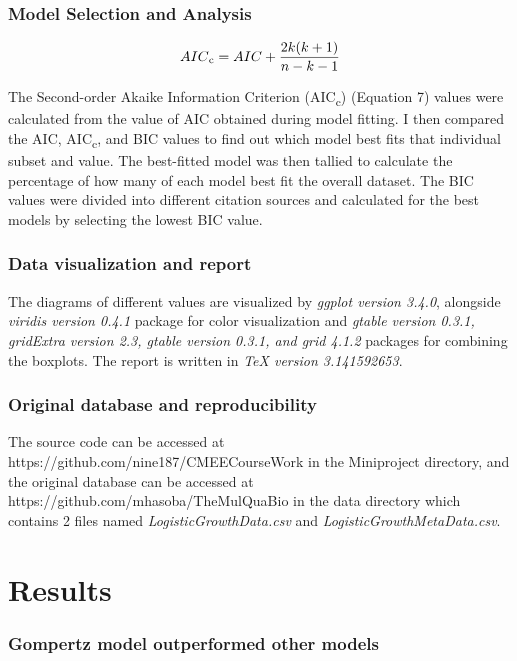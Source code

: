 \documentclass[11pt]{article}
\begin{document}
  \subsubsection*{Model Selection and Analysis}
  \begin{equation}
    AIC\textsubscript{c} = AIC + \frac{2k(k + 1)}{n - k - 1}
  \end{equation}

  \noindent The Second-order Akaike Information Criterion (AIC\textsubscript{c}) (Equation 7) values were calculated from the value of AIC obtained during model fitting.
  I then compared the AIC, AIC\textsubscript{c}, and BIC values to find out which model best fits that individual subset and value.
  The best-fitted model was then tallied to calculate the percentage of how many of each model best fit the overall dataset.
  The BIC values were divided into different citation sources and calculated for the best models by selecting the lowest BIC value. 
  \subsubsection*{Data visualization and report}
  The diagrams of different values are visualized by \textit{ggplot version 3.4.0}, alongside \textit{viridis version 0.4.1} package for color visualization and \textit{gtable version 0.3.1, gridExtra version 2.3, gtable version 0.3.1, and grid 4.1.2} packages for combining the boxplots.
  The report is written in \textit{TeX version 3.141592653}.

  \subsubsection*{Original database and reproducibility}
  The source code can be accessed at https://github.com/nine187/CMEECourseWork in the Miniproject directory, and the original database can be accessed at 
  \newline https://github.com/mhasoba/TheMulQuaBio in the data directory which contains 2 files named \textit{LogisticGrowthData.csv} and \textit{LogisticGrowthMetaData.csv}. 

  \section{Results}

  \subsubsection*{Gompertz model outperformed other models}
  
\end{document}
